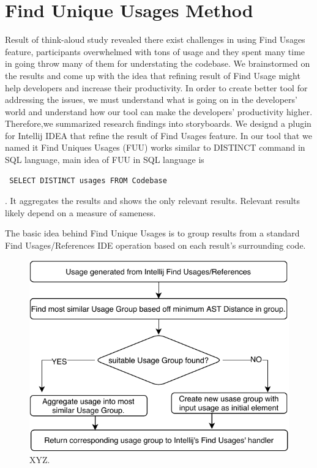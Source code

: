 \documentclass[conference]{IEEEtran}
\begin{document}
\section{Find Unique Usages Method}
Result of think-aloud study  revealed there exist challenges in using Find Usages feature, participants overwhelmed with tons of usage and they spent many time in going throw many of them for understating the codebase. We brainstormed on the results and come up with the idea that refining result of Find Usage might help developers and increase their productivity. In order to create better tool for addressing the issues, we must understand what is going on in the developers' world and understand how our tool can make the developers' productivity higher. Therefore,we summarized research findings into storyboards. We designd a plugin for Intellij IDEA that refine the result of Find Usages feature. In our tool that we named it Find Uniques Usages (FUU) works similar to DISTINCT command in SQL language, main idea of FUU in SQL language is \begin{verbatim} SELECT DISTINCT usages FROM Codebase \end{verbatim}. It aggregates the results and shows the only relevant results. Relevant results likely depend on a measure of sameness.\par



The basic idea behind Find Unique Usages is to group results from a standard Find Usages/References IDE operation based on each result's surrounding code.
\begin{figure}
    \centering
    \includegraphics [width=\columnwidth,keepaspectratio, clip]{figures/flowchart}
    \caption{XYZ. 
}
\label{fig:usege}
\end{figure}
\end{document}
